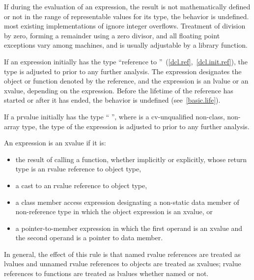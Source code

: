 \pnum
{}%
%
%
%
%
If during the evaluation of an expression, the result is not
mathematically defined or not in the range of representable values for
its type, the behavior is undefined.
\enternote 
{}%
most existing implementations of \Cpp ignore integer overflows.
Treatment of division by zero, forming a remainder using a zero divisor,
and all floating point exceptions vary among machines, and is usually
adjustable by a library function.
\exitnote 

\pnum
{}%
If an expression initially has the type ``reference to
''~(\ref{dcl.ref},~\ref{dcl.init.ref}), the type is adjusted to
 prior to any further analysis. The expression designates the
object or function denoted by the reference, and the expression
is an lvalue or an xvalue, depending on the expression.
\enternote 
Before the lifetime of the reference has started or after it has ended,
the behavior is undefined (see~\ref{basic.life}).
\exitnote 

\pnum
If a prvalue initially has the type ``\cv{} '', where
 is a cv-unqualified non-class, non-array type, the type of
the expression is adjusted to  prior to any further analysis.

\pnum
{}%
\enternote
An expression is an xvalue if it is:
\begin{itemize}
\item the result of calling a function, whether implicitly or explicitly,
whose return type is an rvalue reference to object type,

\item a cast to an rvalue reference to object type,

\item a class member access expression designating a non-static data member
of non-reference type
in which the object expression is an xvalue, or

\item a  pointer-to-member expression in which the first operand is
an xvalue and the second operand is a pointer to data member.
\end{itemize}
In general, the effect of this rule is that named rvalue references are
treated as lvalues and unnamed rvalue references to objects are treated as
xvalues; rvalue references to functions are treated as lvalues whether named or not.
\exitnote

